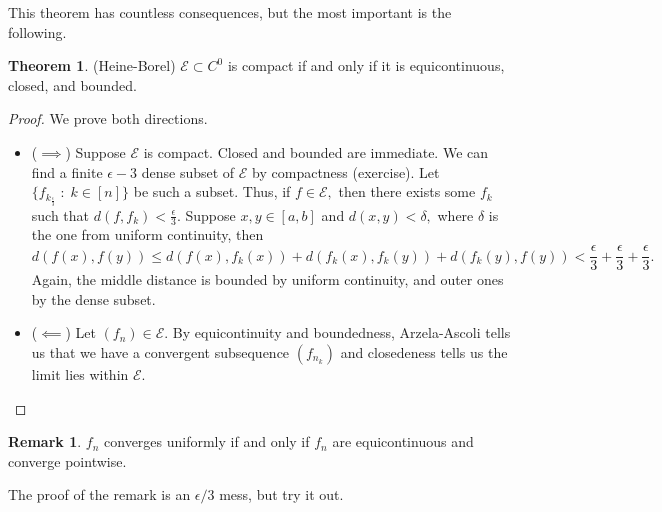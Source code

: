\documentclass[10pt, oneside]{article}
\theoremstyle{definition}
\newtheorem{thm}{Theorem}
\newtheorem{rem}{Remark}
\begin{document}
This theorem has countless consequences, but the most important is the following.
\begin{thm}
    (Heine-Borel) $\mathcal{E}\subset C^0$ is compact if and only if it is equicontinuous, closed, and bounded.
\end{thm}
\begin{proof}
    We prove both directions.
    \begin{itemize}
        \item ($\implies$) Suppose $\mathcal{E}$ is compact. Closed and bounded are immediate. We can find a finite $\epsilon-3$ dense subset of $\mathcal{E}$ by compactness (exercise). Let $\{f_{k_\frac{\epsilon}{3}} \; : \; k \in [n]\}$ be such a subset. Thus, if $f\in \mathcal{E},$ then there exists some $f_k$ such that $d(f, f_k)< \frac{\epsilon}{3}.$ Suppose $x,y \in [a,b]$ and $d(x,y)<\delta,$ where $\delta$ is the one from uniform continuity, then 
        \[d(f(x), f(y))\leq d(f(x), f_k(x)) + d(f_k(x), f_k(y)) + d(f_k(y), f(y))< \frac{\epsilon}{3} + \frac{\epsilon}{3} + \frac{\epsilon}{3}.\] Again, the middle distance is bounded by uniform continuity, and outer ones by the dense subset.
        \item ($\impliedby$) Let $(f_n)\in \mathcal{E}.$ By equicontinuity and boundedness, Arzela-Ascoli tells us that we have a convergent subsequence $(f_{n_k})$ and closedeness tells us the limit lies within $\mathcal{E}.$
    \end{itemize}
\end{proof}
\begin{rem}
    $f_n$ converges uniformly if and only if $f_n$ are equicontinuous and converge pointwise.
\end{rem}
The proof of the remark is an $\epsilon /3$ mess, but try it out. 

\newpage
\end{document}
